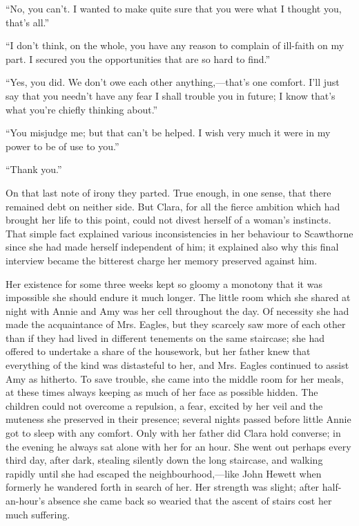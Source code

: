``No, you can't. I wanted to make quite {}sure that you were what I
thought you, that's all.''

``I don't think, on the whole, you have any reason to complain of
ill-faith on my part. I secured you the opportunities that are so hard
to find.''

``Yes, you did. We don't owe each other anything,---that's one comfort.
I'll just say that you needn't have any fear I shall trouble you in
future; I know that's what you're chiefly thinking about.''

``You misjudge me; but that can't be helped. I wish very much it were in
my power to be of use to you.''

``Thank you.''

On that last note of irony they parted. True enough, in one sense, that
there remained debt on neither side. But Clara, for all the fierce
ambition which had brought her life to this point, could not divest
herself of a woman's instincts. That simple fact explained various
inconsistencies in her behaviour to Scawthorne since she had made
herself independent of him; it explained also why this final interview
became the bitterest charge her memory preserved against him.

{}Her existence for some three weeks kept so gloomy a monotony that it
was impossible she should endure it much longer. The little room which
she shared at night with Annie and Amy was her cell throughout the day.
Of necessity she had made the acquaintance of Mrs. Eagles, but they
scarcely saw more of each other than if they had lived in different
tenements on the same staircase; she had offered to undertake a share of
the housework, but her father knew that everything of the kind was
distasteful to her, and Mrs. Eagles continued to assist Amy as hitherto.
To save trouble, she came into the middle room for her meals, at these
times always keeping as much of her face as possible hidden. The
children could not overcome a repulsion, a fear, excited by her veil and
the muteness she preserved in their presence; several nights passed
before little Annie got to sleep with any comfort. Only with her father
did Clara hold converse; in the evening he always sat alone with her for
an hour. She went out perhaps every third day, after dark, stealing
silently down the long staircase, and walking rapidly until she had
escaped the {}neighbourhood,---like John Hewett when formerly he
wandered forth in search of her. Her strength was slight; after
half-an-hour's absence she came back so wearied that the ascent of
stairs cost her much suffering.

